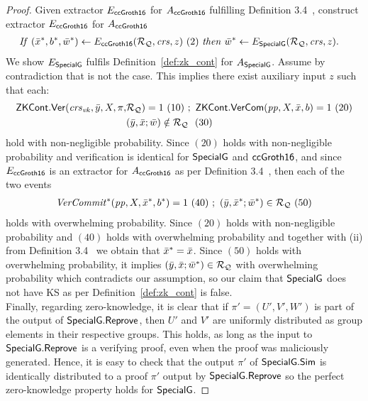 \begin{proof}
\noindent Given extractor $E_{{\mathsf{ccGroth16}}}$ for $A_{{\mathsf{ccGroth16}}}$ fulfilling Definition 3.4~\cite{LegoSNARK}, 
construct extractor $E_{{\mathsf{ccGroth16}}}$ for $A_{{\mathsf{ccGroth16}}}$
\begin{align*}
&\mathit{If} \ (\bar{x}^*, b^*, \bar{w}^*) \leftarrow E_{{\mathsf{ccGroth16}}} (\mathcal{R}_{\mathcal{Q}}, \mathit{crs}, z)\ (2)\ \mathit{then} \ \bar{w}^* \leftarrow E_{{\mathsf{SpecialG}}} (\mathcal{R}_{\mathcal{Q}}, \mathit{crs}, z).
\end{align*}
We show $E_{{\mathsf{SpecialG}}}$ fulfils Definition~\ref{def:zk_cont} for $A_{{\mathsf{SpecialG}}}$. Assume by contradiction that is not the case. 
This implies there exist auxiliary input $z$ such that each: 
\begin{align*}
\ZKCont.\Verify(\crsvk, \bary, X, \pi, &\relRQ) =1 \ (10)\ ; \ \ZKCont.\VerifyCom(\pp, X, \barx, b) =1 \ (20) \\
& (\bary, \barx; \baromega) \notin \relRQ  \ \ (30) 
\end{align*}
hold with non-negligible probability. Since $(20)$ holds with non-negligible probability and verification is identical for 
${\mathsf{SpecialG}}$ and ${\mathsf{ccGroth16}}$, and since $E_{{\mathsf{ccGroth16}}}$ is an extractor for $A_{{\mathsf{ccGroth16}}}$ as per Definition 3.4~\cite{LegoSNARK},
 then each of the two events 
\begin{align*}
\mathit{VerCommit^*}(\mathit{pp}, X, \bar{x}^*, b^*) =1 \ (40) \ ; \ (\bar{y}, \bar{x}^*; \bar{w}^*) \in  \mathcal{R}_{\mathcal{Q}} \ (50)
\end{align*}
holds with overwhelming probability. Since $(20)$ holds with non-negligible probability and $(40)$ holds with overwhelming probability and 
together with (ii) from Definition 3.4~\cite{LegoSNARK} we obtain that $\bar{x}^* = \bar{x}$. Since $(50)$ holds with overwhelming probability, it implies 
$(\bar{y}, \bar{x}; \bar{w}^*) \in \mathcal{R}_{\mathcal{Q}} $ with overwhelming probability which contradicts our assumption, so our claim that ${\mathsf{SpecialG}}$ does not have 
KS as per Definition~\ref{def:zk_cont} is false. \\

\noindent Finally, regarding zero-knowledge, it is clear that if $\pi' = (U', V', W')$ is part of the output of ${\mathsf{SpecialG}}.{\mathsf{Reprove}}$, 
then $U'$ and $V'$ are uniformly distributed as group elements in their respective groups. This holds, as long as the 
input to ${\mathsf{SpecialG}}.{\mathsf{Reprove}}$ is a verifying proof, even when the proof was maliciously generated. Hence, it is easy to check  
that the output $\pi'$ of ${\mathsf{SpecialG}}.{\mathsf{Sim}}$ is identically distributed to a proof $\pi'$ output by ${\mathsf{SpecialG}}.{\mathsf{Reprove}}$ so the perfect 
zero-knowledge property holds for ${\mathsf{SpecialG}}$. 
\end{proof}


